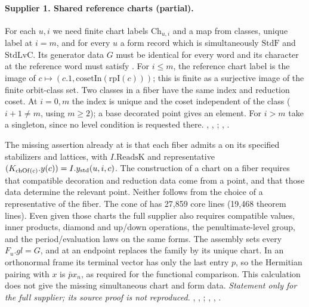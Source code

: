\paragraph{Supplier 1. Shared reference charts (partial).}
For each $u,i$ we need finite chart labels $\mathrm{Ch}_{u,i}$ and a map
from classes, unique label at $i=m$, and for every $u$ a form record
which is simultaneously $\mathrm{StdF}$ and $\mathrm{StdLvC}$. Its generator
data $G$ must be identical for every word and its character at the
reference word must satisfy .
For $i\le m$, the reference chart label is the image of
$c\mapsto (c.1,\mathrm{cosetIn}(\mathrm{rpI}(c)))$; this is finite as
a surjective image of the finite orbit-class set. Two classes in a fiber
have the same index and reduction coset. At $i=0,m$ the index is unique
and the coset independent of the class ($i+1\ne m$, using $m\ge2$);
a base decorated point gives an element. For $i>m$ take a singleton,
since no level condition is requested there.
, ,
;
, .

The missing assertion already at  is that each fiber
admits a  on its specified stabilizers and lattices,
with $I.\mathrm{ReadsK}$ and representative
$(K_{\mathrm{chOf}(c)}.y(c))=I.y_{\rm std}(u,i,c)$.
The construction of a chart on a fiber requires that compatible
decoration and reduction data come from a point, and that those data
determine the relevant point. Neither follows from the choice of a
representative of the fiber. The cone of  has
27,859 core lines (19,468 theorem lines).
Even given those charts the full supplier also requires compatible
values, inner products, diamond and up/down operations, the
penultimate-level group, and the period/evaluation laws on the same
forms. The assembly sets every $F_u.gl=G$, and at an endpoint replaces
the family by its unique chart. In an orthonormal frame its terminal
vector has only the last entry $p$, so the Hermitian pairing with $x$
is $\bar p x_n$, as required for the functional comparison. This
calculation does not give the missing simultaneous chart and form data.
\emph{Statement only for the full supplier; its source proof is not reproduced.}
, , ;
, ,
.

